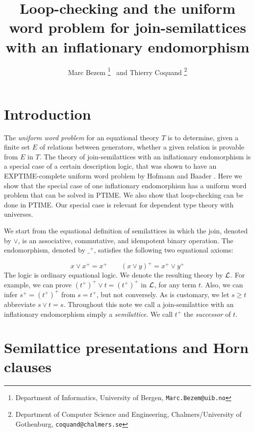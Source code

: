 \documentclass[11pt,a4paper]{article}
\newcommand\lathy{{\cal L}}
\newcommand{\FYI}[1]{{\color{red}#1}}
\begin{document}
\title{Loop-checking and the uniform word problem
for join-semilattices with an inflationary endomorphism}

\author{Marc Bezem%
\thanks{Department of Informatics, University of Bergen, {\tt Marc.Bezem@uib.no}}
~and Thierry Coquand
\thanks{Department of Computer Science and Engineering, 
Chalmers/University of Gothenburg, {\tt coquand@chalmers.se}}
}
\date{}


\maketitle


\section{Introduction}\label{sec:intro}
The \emph{uniform word problem} for an equational theory $T$ is
to determine, given a finite set $E$ of relations between generators,
whether a given relation is provable from $E$ in $T$.
The theory of join-semilattices with an inflationary endomorphism
is a special case of a certain description logic, that was shown
to have an EXPTIME-complete uniform word problem by Hofmann \cite{Hofmann}
and Baader \cite{Baader}.
Here we show that the special case of one inflationary endomorphism
has a uniform word problem that can be solved in PTIME. We also
show that loop-checking can be done in PTIME.
Our special case is relevant for dependent type theory with universes.

We start from the equational definition of semilattices in which the
join, denoted by $\vee$, is an associative, commutative, and idempotent
binary operation. The endomorphism, denoted by ${\_}^+$,
satisfies the following two equational axioms:

\[
x \vee x^+ = x^+ \quad \quad (x\vee y)^+ = x^+ \vee y^+
\] 
The logic is ordinary equational logic.
We denote the resulting theory by $\lathy$.
For example, we can prove $(t^+)^+ \vee t = (t^+)^+$ in $\lathy$,
for any term $t$. Also, we can infer $s^+ = (t^+)^+$
from $s = t^+$, but not conversely. 
As is customary, we let $s\geq t$ abbreviate $s\vee t = s$.
\FYI{Throughout this note we call a join-semilattice with an inflationary 
endomorphism simply a \emph{semilattice}. 
We call ${t}^+$ the \emph{successor} of $t$.}


\section{Semilattice presentations and Horn clauses}\label{sec:latt-Horn}
\end{document}
